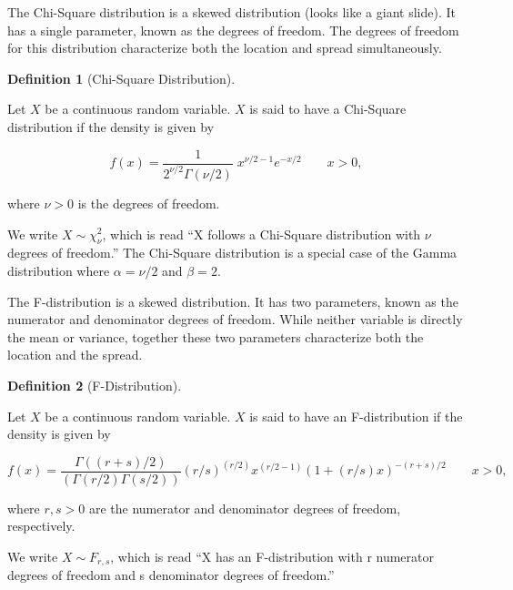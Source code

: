 \documentclass[
  letterpaper,
  DIV=11,
  numbers=noendperiod]{scrreprt}
\theoremstyle{definition}
\newtheorem{definition}{Definition}[chapter]
\theoremstyle{definition}
\theoremstyle{plain}
\theoremstyle{remark}
\begin{document}
The Chi-Square distribution is a skewed distribution (looks like a giant
slide). It has a single parameter, known as the degrees of freedom. The
degrees of freedom for this distribution characterize both the location
and spread simultaneously.

\begin{definition}[Chi-Square
Distribution]\protect\hypertarget{def-chi-square-distribution}{}\label{def-chi-square-distribution}

Let \(X\) be a continuous random variable. \(X\) is said to have a
Chi-Square distribution if the density is given by

\[f(x) = \frac{1}{2^{\nu/2}\Gamma (\nu/2)}\;x^{\nu/2-1}e^{-x/2} \qquad x > 0,\]

where \(\nu > 0\) is the degrees of freedom.

We write \(X \sim \chi^2_{\nu}\), which is read ``X follows a Chi-Square
distribution with \(\nu\) degrees of freedom.'' The Chi-Square
distribution is a special case of the Gamma distribution where
\(\alpha = \nu/2\) and \(\beta = 2\).

\end{definition}

The F-distribution is a skewed distribution. It has two parameters,
known as the numerator and denominator degrees of freedom. While neither
variable is directly the mean or variance, together these two parameters
characterize both the location and the spread.

\begin{definition}[F-Distribution]\protect\hypertarget{def-f-distribution}{}\label{def-f-distribution}

Let \(X\) be a continuous random variable. \(X\) is said to have an
F-distribution if the density is given by

\[f(x) = \frac{\Gamma((r + s)/2)}{(\Gamma(r/2) \Gamma(s/2))} (r/s)^{(r/2)} x^{(r/2 - 1)} (1 + (r/s) x)^{-(r + s)/2} \qquad x > 0,\]

where \(r,s > 0\) are the numerator and denominator degrees of freedom,
respectively.

We write \(X \sim F_{r, s}\), which is read ``X has an F-distribution
with r numerator degrees of freedom and s denominator degrees of
freedom.''

\end{definition}
\end{document}
